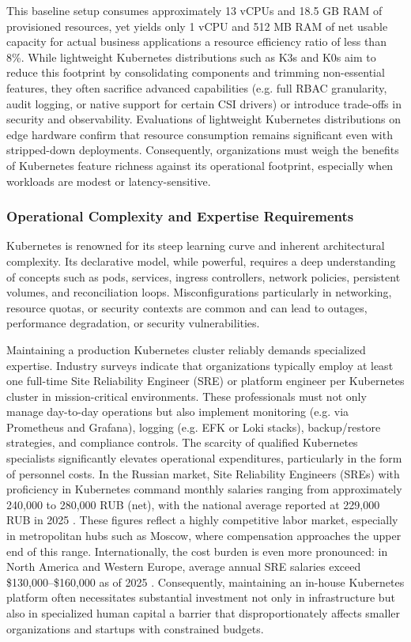 This baseline setup consumes approximately 13 vCPUs and 18.5 GB RAM of provisioned resources, yet yields only 1 vCPU and 512 MB RAM of net usable capacity for actual business applications a resource efficiency ratio of less than 8\%. While lightweight Kubernetes distributions such as K3s \cite{k3s_docs} and K0s \cite{k0s_docs} aim to reduce this footprint by consolidating components and trimming non-essential features, they often sacrifice advanced capabilities (e.g. full RBAC granularity, audit logging, or native support for certain CSI drivers) or introduce trade-offs in security and observability. Evaluations of lightweight Kubernetes distributions on edge hardware \cite{cilic2023edgeeval, usman2024lightweight} confirm that resource consumption remains significant even with stripped-down deployments. Consequently, organizations must weigh the benefits of Kubernetes feature richness against its operational footprint, especially when workloads are modest or latency-sensitive.

\subsubsection{Operational Complexity and Expertise Requirements}
Kubernetes is renowned for its steep learning curve and inherent architectural complexity. Its declarative model, while powerful, requires a deep understanding of concepts such as pods, services, ingress controllers, network policies, persistent volumes, and reconciliation loops. Misconfigurations particularly in networking, resource quotas, or security contexts are common and can lead to outages, performance degradation, or security vulnerabilities.

Maintaining a production Kubernetes cluster reliably demands specialized expertise. Industry surveys indicate that organizations typically employ at least one full-time Site Reliability Engineer (SRE) or platform engineer per Kubernetes cluster in mission-critical environments. These professionals must not only manage day-to-day operations but also implement monitoring (e.g. via Prometheus and Grafana), logging (e.g. EFK or Loki stacks), backup/restore strategies, and compliance controls. The scarcity of qualified Kubernetes specialists significantly elevates operational expenditures, particularly in the form of personnel costs. In the Russian market, Site Reliability Engineers (SREs) with proficiency in Kubernetes command monthly salaries ranging from approximately 240,000 to 280,000 RUB (net), with the national average reported at 229,000 RUB in 2025 \cite{dreamjob_sre_2025}. These figures reflect a highly competitive labor market, especially in metropolitan hubs such as Moscow, where compensation approaches the upper end of this range. Internationally, the cost burden is even more pronounced: in North America and Western Europe, average annual SRE salaries exceed \$130,000–\$160,000 as of 2025 \cite{stackoverflow_dev_survey_2025}. Consequently, maintaining an in-house Kubernetes platform often necessitates substantial investment not only in infrastructure but also in specialized human capital a barrier that disproportionately affects smaller organizations and startups with constrained budgets.

